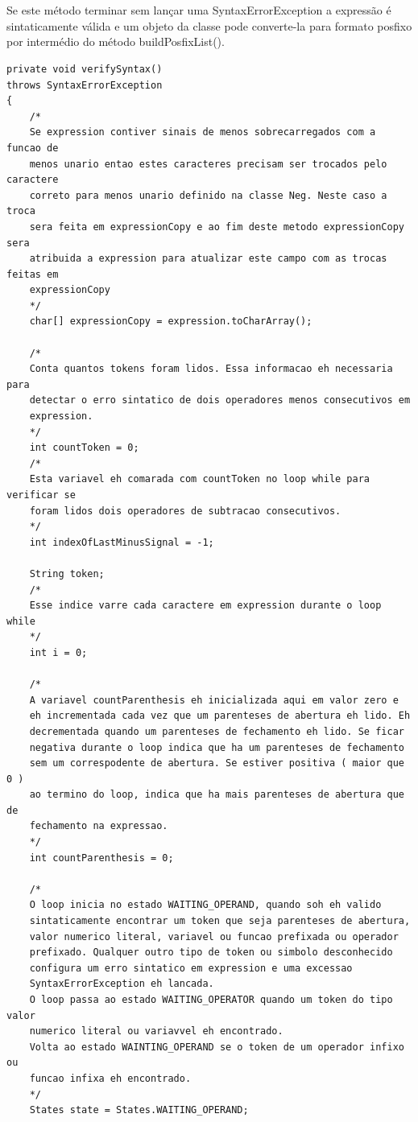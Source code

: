 \documentclass[a4paper,12pt,openany]{book}
\begin{document}
\\
\\
Se este método terminar sem lançar uma SyntaxErrorException a expressão é sintaticamente válida e um objeto da classe pode converte-la para formato posfixo por intermédio do método buildPosfixList().


\begin{lstlisting}
private void verifySyntax()
throws SyntaxErrorException
{
	/*
	Se expression contiver sinais de menos sobrecarregados com a funcao de
	menos unario entao estes caracteres precisam ser trocados pelo caractere
	correto para menos unario definido na classe Neg. Neste caso a troca 
	sera feita em expressionCopy e ao fim deste metodo expressionCopy sera
	atribuida a expression para atualizar este campo com as trocas feitas em
	expressionCopy
	*/
	char[] expressionCopy = expression.toCharArray();
	
	/*
	Conta quantos tokens foram lidos. Essa informacao eh necessaria para
	detectar o erro sintatico de dois operadores menos consecutivos em 
	expression. 
	*/
	int countToken = 0;
	/*
	Esta variavel eh comarada com countToken no loop while para verificar se
	foram lidos dois operadores de subtracao consecutivos.
	*/
	int indexOfLastMinusSignal = -1;
	
	String token;
	/*
	Esse indice varre cada caractere em expression durante o loop while
	*/
	int i = 0;
	
	/*
	A variavel countParenthesis eh inicializada aqui em valor zero e
	eh incrementada cada vez que um parenteses de abertura eh lido. Eh
	decrementada quando um parenteses de fechamento eh lido. Se ficar 
	negativa durante o loop indica que ha um parenteses de fechamento
	sem um correspodente de abertura. Se estiver positiva ( maior que 0 )
	ao termino do loop, indica que ha mais parenteses de abertura que de
	fechamento na expressao.
	*/
	int countParenthesis = 0;
	
	/*
	O loop inicia no estado WAITING_OPERAND, quando soh eh valido 
	sintaticamente encontrar um token que seja parenteses de abertura,
	valor numerico literal, variavel ou funcao prefixada ou operador 
	prefixado. Qualquer outro tipo de token ou simbolo desconhecido 
	configura um erro sintatico em expression e uma excessao 
	SyntaxErrorException eh lancada.
	O loop passa ao estado WAITING_OPERATOR quando um token do tipo valor
	numerico literal ou variavvel eh encontrado.
	Volta ao estado WAINTING_OPERAND se o token de um operador infixo ou 
	funcao infixa eh encontrado.
	*/
	States state = States.WAITING_OPERAND;
	

\end{lstlisting}
\end{document}
